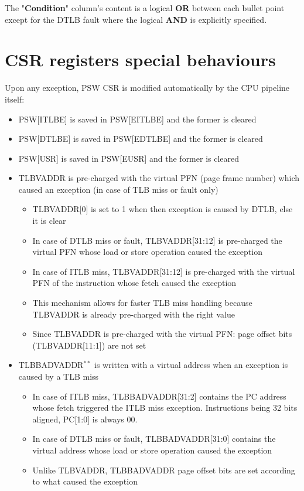 \documentclass[a4paper,11pt]{article}
\begin{document}
The "\textbf{Condition}" column's content is a logical \textbf{OR} between each bullet point except for the DTLB fault where the logical \textbf{AND} is explicitly specified.

\section{CSR registers special behaviours}

Upon any exception, PSW CSR is modified automatically by the CPU pipeline itself:

\begin{itemize}
	\item PSW[ITLBE] is saved in PSW[EITLBE] and the former is cleared
	\item PSW[DTLBE] is saved in PSW[EDTLBE] and the former is cleared
	\item PSW[USR] is saved in PSW[EUSR] and the former is cleared
	\item TLBVADDR is pre-charged with the virtual PFN (page frame number) which caused an exception (in case of TLB miss or fault only)
	\begin{itemize}
		\item TLBVADDR[0] is set to 1 when then exception is caused by DTLB, else it is clear
		\item In case of DTLB miss or fault, TLBVADDR[31:12] is pre-charged the virtual PFN whose load or store operation caused the exception
		\item In case of ITLB miss, TLBVADDR[31:12] is pre-charged with the virtual PFN of the instruction whose fetch caused the exception
		\item This mechanism allows for faster TLB miss handling because TLBVADDR is already pre-charged with the right value
		\item Since TLBVADDR is pre-charged with the virtual PFN: page offset bits (TLBVADDR[11:1]) are not set
	\end{itemize}
	\item TLBBADVADDR$^{**}$ is written with a virtual address when an exception is caused by a TLB miss
	\begin{itemize}
		\item In case of ITLB miss, TLBBADVADDR[31:2] contains the PC address whose fetch triggered the ITLB miss exception. Instructions being 32 bits aligned, PC[1:0] is always 00.
		\item In case of DTLB miss or fault, TLBBADVADDR[31:0] contains the virtual address whose load or store operation caused the exception
		\item Unlike TLBVADDR, TLBBADVADDR page offset bits are set according to what caused the exception
	\end{itemize}
\end{itemize}
\end{document}
